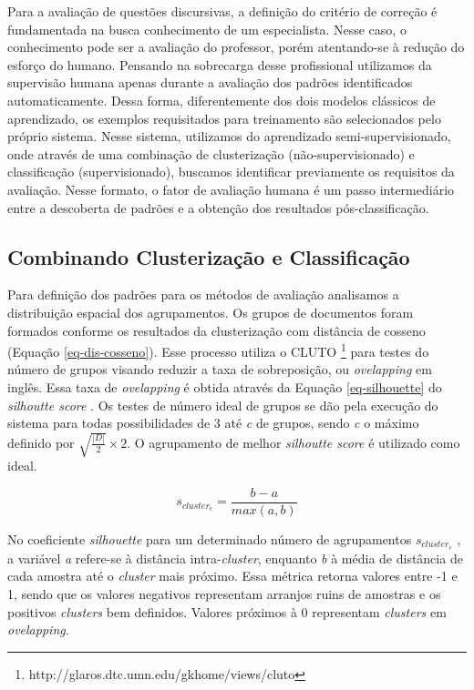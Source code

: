 Para a avaliação de questões discursivas, a definição do critério de correção é fundamentada na busca conhecimento de um especialista. Nesse caso, o conhecimento pode ser a avaliação do professor, porém atentando-se à redução do esforço do humano. Pensando na sobrecarga desse profissional utilizamos da supervisão humana apenas durante a avaliação dos padrões identificados automaticamente. Dessa forma, diferentemente dos dois modelos clássicos de aprendizado, os exemplos requisitados para treinamento são selecionados pelo próprio sistema. Nesse sistema, utilizamos do aprendizado semi-supervisionado, onde através de uma combinação de clusterização (não-supervisionado) e classificação (supervisionado), buscamos identificar previamente os requisitos da avaliação. Nesse formato, o fator de avaliação humana é um passo intermediário entre a descoberta de padrões e a obtenção dos resultados pós-classificação.

\subsection{Combinando Clusterização e Classificação}
Para definição dos padrões para os métodos de avaliação analisamos a distribuição espacial dos agrupamentos. Os grupos de documentos foram formados conforme os resultados da clusterização com distância de cosseno (Equação \ref{eq-dis-cosseno}). Esse processo utiliza o CLUTO \footnote{http://glaros.dtc.umn.edu/gkhome/views/cluto} \cite{karypis2002} para testes do número de grupos visando reduzir a taxa de sobreposição, ou \textit{ovelapping} em inglês. Essa taxa de \textit{ovelapping} é obtida através da Equação \ref{eq-silhouette} do \textit{silhoutte score} \cite{rousseeuw1987}. Os testes de número ideal de grupos se dão pela execução do sistema para todas possibilidades de 3 até \textit{c} de grupos, sendo \textit{c} o máximo definido por $ \sqrt{\frac{|D|}{2}} \times{2} $. O agrupamento de melhor \textit{silhoutte score} é utilizado como ideal.

\begin{equation}
s_{cluster_{c}} = \frac{b - a}{max(a, b)}
\label{eq-silhouette}
\end{equation}

No coeficiente \textit{silhouette} para um determinado número de agrupamentos $ s_{cluster_{c}} $ , a variável \textit{a} refere-se à distância intra-\textit{cluster}, enquanto \textit{b} à média de distância de cada amostra até o \textit{cluster} mais próximo. Essa métrica retorna valores entre -1 e 1, sendo que os valores negativos representam arranjos ruins de amostras e os positivos \textit{clusters} bem definidos. Valores próximos à 0 representam \textit{clusters} em \textit{ovelapping}.

